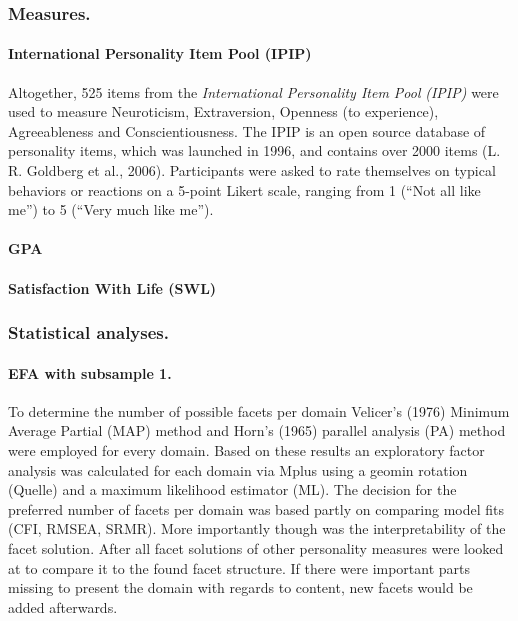 \documentclass[,man]{apa6}
\let\oldparagraph\paragraph
\renewcommand{\paragraph}[1]{\oldparagraph{#1}\mbox{}}
\theoremstyle{definition}
\theoremstyle{definition}
\theoremstyle{definition}
\theoremstyle{remark}
\begin{document}
\hypertarget{measures.}{%
\subsubsection{Measures.}\label{measures.}}

\hypertarget{international-personality-item-pool-ipip}{%
\paragraph{International Personality Item Pool
(IPIP)}\label{international-personality-item-pool-ipip}}

Altogether, 525 items from the \emph{International Personality Item
Pool} \emph{(IPIP)} were used to measure Neuroticism, Extraversion,
Openness (to experience), Agreeableness and Conscientiousness. The IPIP
is an open source database of personality items, which was launched in
1996, and contains over 2000 items (L. R. Goldberg et al., 2006).
Participants were asked to rate themselves on typical behaviors or
reactions on a 5-point Likert scale, ranging from 1 (\enquote{Not all
like me}) to 5 (\enquote{Very much like me}).

\hypertarget{gpa}{%
\paragraph{GPA}\label{gpa}}

\hypertarget{satisfaction-with-life-swl}{%
\paragraph{Satisfaction With Life
(SWL)}\label{satisfaction-with-life-swl}}

\hypertarget{statistical-analyses.}{%
\subsubsection{Statistical analyses.}\label{statistical-analyses.}}

\hypertarget{efa-with-subsample-1.}{%
\paragraph{EFA with subsample 1.}\label{efa-with-subsample-1.}}

To determine the number of possible facets per domain Velicer's (1976)
Minimum Average Partial (MAP) method and Horn's (1965) parallel analysis
(PA) method were employed for every domain. Based on these results an
exploratory factor analysis was calculated for each domain via Mplus
using a geomin rotation (Quelle) and a maximum likelihood estimator
(ML). The decision for the preferred number of facets per domain was
based partly on comparing model fits (CFI, RMSEA, SRMR). More
importantly though was the interpretability of the facet solution. After
all facet solutions of other personality measures were looked at to
compare it to the found facet structure. If there were important parts
missing to present the domain with regards to content, new facets would
be added afterwards.
\end{document}
